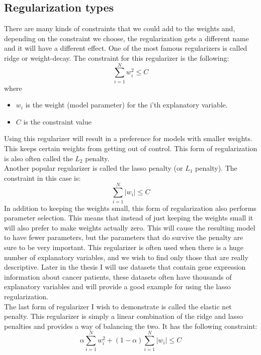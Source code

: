 \subsection{Regularization types}
There are many kinds of constraints that we could add to the weights and, depending on the constraint we choose, the regularization gets a different name and it will have a different effect. One of the most famous regularizers is called ridge or weight-decay. The constraint for this regularizer is the following:
$$
\sum_{i=1}^{N}w_{i}^{2} \leq C
$$
where
\begin{itemize}
	\item $w_{i}$ is the weight (model parameter) for the i'th explanatory variable.
	\item $C$ is the constraint value
\end{itemize}
Using this regularizer will result in a preference for models with smaller weights. This keeps certain weights from getting out of control. This form of regularization is also often called the $L_{2}$ penalty. \\
Another popular regularizer is called the lasso penalty (or $L_{1}$ penalty). The constraint in this case is:
$$
\sum_{i=1}^{N}\lvert w_{i}\rvert \leq C
$$
In addition to keeping the weights small, this form of regularization also performs parameter selection. This means that instead of just keeping the weights small it will also prefer to make weights actually zero. This will cause the resulting model to have fewer parameters, but the parameters that do survive the penalty are sure to be very important. This regularizer is often used when there is a huge number of explanatory variables, and we wish to find only those that are really descriptive. Later in the thesis I will use datasets that contain gene expression information about cancer patients, these datasets often have thousands of explanatory variables and will provide a good example for using the lasso regularization. \\
The last form of regularizer I wish to demonstrate is called the elastic net penalty. This regularizer is simply a linear combination of the ridge and lasso penalties and provides a way of balancing the two. It has the following constraint:
$$
\alpha \sum_{i=1}^{N}w_{i}^{2} + (1-\alpha)\sum_{i=1}^{N}\lvert w_{i}\rvert \leq C
$$
